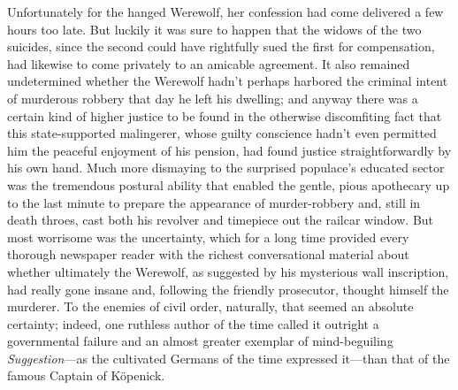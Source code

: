 \documentclass[12pt,a4paper]{article}
\begin{document}
Unfortunately for the hanged Werewolf, her confession had come delivered a few hours too late. But luckily it was sure to happen that the widows of the two suicides, since the second could have rightfully sued the first for compensation, had likewise to come privately to an amicable agreement. It also remained undetermined whether the Werewolf hadn’t perhaps harbored the criminal intent of murderous robbery that day he left his dwelling; and anyway there was a certain kind of higher justice to be found in the otherwise discomfiting fact that this state-supported malingerer, whose guilty conscience hadn’t even permitted him the peaceful enjoyment of his pension, had found justice straightforwardly by his own hand. Much more dismaying to the surprised populace’s educated sector was the tremendous postural ability that enabled the gentle, pious apothecary up to the last minute to prepare the appearance of murder-robbery and, still in death throes, cast both his revolver and timepiece out the railcar window. But most worrisome was the uncertainty, which for a long time provided every thorough newspaper reader with the richest conversational material about whether ultimately the Werewolf, as suggested by his mysterious wall inscription, had really gone insane and, following the friendly prosecutor, thought himself the murderer. To the enemies of civil order, naturally, that seemed an absolute certainty; indeed, one ruthless author of the time called it outright a governmental failure and an almost greater exemplar of mind-beguiling \textit{Suggestion}—as the cultivated Germans of the time expressed it—than that of the famous Captain of Köpenick.
\end{document}
